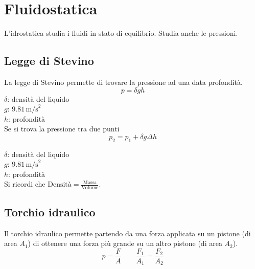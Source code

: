 
\section{Fluidostatica}
L'idrostatica studia i fluidi in stato di equilibrio. Studia anche le pressioni.
\subsection{Legge di Stevino}
La legge di Stevino permette di trovare la pressione ad una data profondità.
\begin{equation*}
  p = \delta gh
\end{equation*}
$\delta$: densità del liquido\\
\hyperref[tab:g]{$g$}: $9.81\,\text{m/s}^2$\\
$h$: profondità\\[\baselineskip]
Se si trova la pressione tra due punti
\begin{equation*}
  p_2 = p_1 + \delta g\Delta h
\end{equation*}
\begin{center}
\end{center}

$\delta$: densità del liquido\\
\hyperref[tab:g]{$g$}: $9.81\,\text{m/s}^2$\\
$h$: profondità\\ [\baselineskip]

Si ricordi che $\text{Densità}=\frac{\text{Massa}}{\text{Volume}}$.

\subsection{Torchio idraulico}
\begin{center}
\end{center}
Il torchio idraulico permette partendo da una forza applicata su un pistone (di area $A_1$) di ottenere
una forza più grande su un altro pistone (di area $A_2$).
\begin{equation*}
  p = \frac{F}{A}\qquad \frac{F_1}{A_1}=\frac{F_2}{A_2}
\end{equation*}


